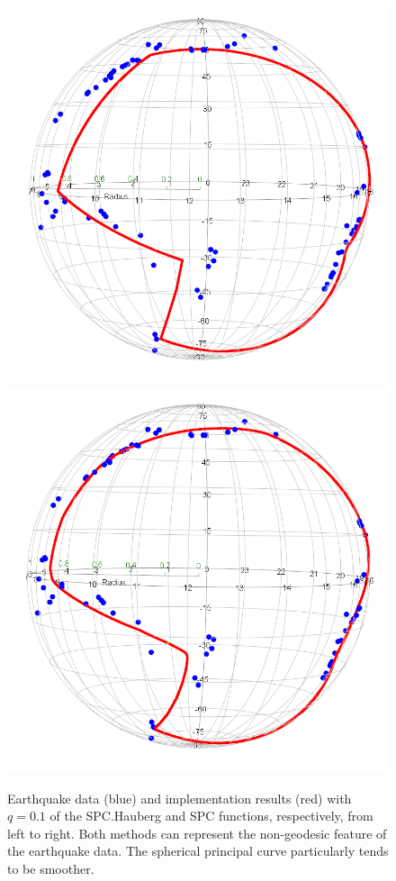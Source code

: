 \begin{figure}[!h]
    \centering
    \includegraphics[scale=0.265]{figures/SPCHauberg(earthquake).png}
    \hspace{0.6cm}
    \includegraphics[scale=0.265]{figures/SPC(earthquake).png}
    \caption{Earthquake data (blue) and implementation results (red) with $q = 0.1$ of the SPC.Hauberg and SPC functions, respectively, from left to right. Both methods can represent the non-geodesic feature of the earthquake data. The spherical principal curve particularly tends to be smoother.} 
     \label{fig:SPC}
\end{figure}

